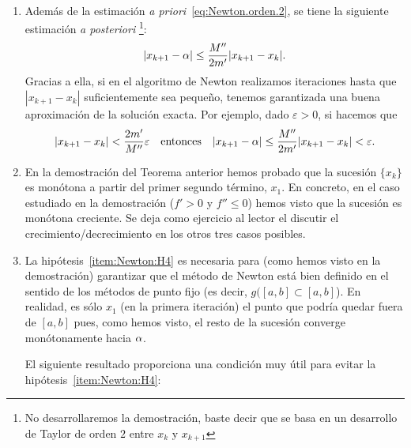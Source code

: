 \begin{remark}~
  \label{rk:4}
  \begin{enumerate}
  \item Además de la estimación \textit{a
      priori}~\eqref{eq:Newton.orden.2}, se tiene la siguiente
    estimación \textit{a posteriori}%
    \footnote{No desarrollaremos la demostración, baste decir que se basa
      en un desarrollo de Taylor de orden $2$ entre $x_k$ y
      $x_{k+1}$}:
    \begin{equation}
      |x_{k+1}-\alpha| \le \frac{M''}{2m'}|x_{k+1}-x_k|.
      \label{eq:newton.estimac.a.posteriori}
    \end{equation}
    Gracias a ella, si en el algoritmo de Newton realizamos
    iteraciones hasta que $|x_{k+1}-x_k|$ suficientemente sea pequeño,
    tenemos garantizada una buena aproximación de la solución
    exacta. Por ejemplo, dado $\varepsilon>0$, si hacemos que
    $$
    |x_{k+1}-x_k| < \frac{2m'}{M''} \varepsilon
    \quad\text{entonces}\quad 
      |x_{k+1}-\alpha| \le \frac{M''}{2m'}|x_{k+1}-x_k|<\varepsilon.
    $$ 
  \item En la demostración del Teorema anterior hemos probado que la
    sucesión $\{x_k\}$ es monótona a partir del primer segundo
    término, $x_1$. En concreto, en el caso estudiado en la
    demostración ($f'>0$ y $f''\le 0$) hemos visto que la sucesión es
    monótona creciente. Se deja como ejercicio al lector el discutir
    el crecimiento/decrecimiento en los otros tres casos posibles.
  \item La hipótesis~\ref{item:Newton:H4} es necesaria para (como
    hemos visto en la demostración) garantizar que el método de Newton
    está bien definido en el sentido de los métodos de punto fijo (es
    decir, $g([a,b]\subset [a,b]$). En realidad, es sólo $x_1$ (en la
    primera iteración) el punto que podría quedar fuera de $[a,b]$
    pues, como hemos visto, el resto de la sucesión converge
    monótonamente hacia $\alpha$.

    El siguiente resultado proporciona una condición muy útil para
    evitar la hipótesis~\ref{item:Newton:H4}:
  \end{enumerate}
\end{remark}

